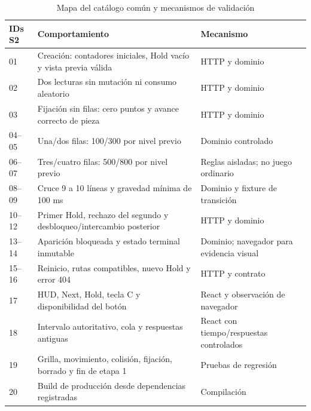\begin{table}[H]\centering\small\setlength{\tabcolsep}{4pt}\renewcommand{\arraystretch}{1.06}
\caption{Mapa del catálogo común y mecanismos de validación}
\label{tab:catalogo_tetris_e2}
\begin{tabularx}{\textwidth}{l Y Y}\toprule

\textbf{IDs S2} & \textbf{Comportamiento} & \textbf{Mecanismo} \\ \midrule

01 & Creación: contadores iniciales, Hold vacío y vista previa válida & HTTP y dominio \\

02 & Dos lecturas sin mutación ni consumo aleatorio & HTTP y dominio \\

03 & Fijación sin filas: cero puntos y avance correcto de pieza & HTTP y dominio \\

04--05 & Una/dos filas: 100/300 por nivel previo & Dominio controlado \\

06--07 & Tres/cuatro filas: 500/800 por nivel previo & Reglas aisladas; no juego ordinario \\

08--09 & Cruce 9 a 10 líneas y gravedad mínima de 100 ms & Dominio y fixture de transición \\

10--12 & Primer Hold, rechazo del segundo y desbloqueo/intercambio posterior & HTTP y dominio \\

13--14 & Aparición bloqueada y estado terminal inmutable & Dominio; navegador para evidencia visual \\

15--16 & Reinicio, rutas compatibles, nuevo Hold y error 404 & HTTP y contrato \\

17 & HUD, Next, Hold, tecla C y disponibilidad del botón & React y observación de navegador \\

18 & Intervalo autoritativo, cola y respuestas antiguas & React con tiempo/respuestas controlados \\

19 & Grilla, movimiento, colisión, fijación, borrado y fin de etapa 1 & Pruebas de regresión \\

20 & Build de producción desde dependencias registradas & Compilación \\

\bottomrule\end{tabularx}

\end{table}


